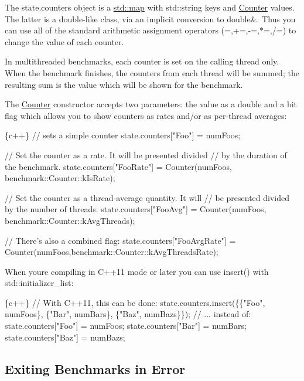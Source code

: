 The {\ttfamily state.\+counters} object is a {\ttfamily \mbox{\hyperlink{classstd_1_1map}{std\+::map}}} with {\ttfamily std\+::string} keys and {\ttfamily \mbox{\hyperlink{class_counter}{Counter}}} values. The latter is a {\ttfamily double}-\/like class, via an implicit conversion to {\ttfamily double\&}. Thus you can use all of the standard arithmetic assignment operators ({\ttfamily =,+=,-\/=,$\ast$=,/=}) to change the value of each counter.

In multithreaded benchmarks, each counter is set on the calling thread only. When the benchmark finishes, the counters from each thread will be summed; the resulting sum is the value which will be shown for the benchmark.

The {\ttfamily \mbox{\hyperlink{class_counter}{Counter}}} constructor accepts two parameters\+: the value as a {\ttfamily double} and a bit flag which allows you to show counters as rates and/or as per-\/thread averages\+:


\begin{DoxyCode}
\{c++\}
  // sets a simple counter
  state.counters["Foo"] = numFoos;

  // Set the counter as a rate. It will be presented divided
  // by the duration of the benchmark.
  state.counters["FooRate"] = Counter(numFoos, benchmark::Counter::kIsRate);

  // Set the counter as a thread-average quantity. It will
  // be presented divided by the number of threads.
  state.counters["FooAvg"] = Counter(numFoos, benchmark::Counter::kAvgThreads);

  // There's also a combined flag:
  state.counters["FooAvgRate"] = Counter(numFoos,benchmark::Counter::kAvgThreadsRate);
\end{DoxyCode}


When you\textquotesingle{}re compiling in C++11 mode or later you can use {\ttfamily insert()} with {\ttfamily std\+::initializer\+\_\+list}\+:


\begin{DoxyCode}
\{c++\}
  // With C++11, this can be done:
  state.counters.insert(\{\{"Foo", numFoos\}, \{"Bar", numBars\}, \{"Baz", numBazs\}\});
  // ... instead of:
  state.counters["Foo"] = numFoos;
  state.counters["Bar"] = numBars;
  state.counters["Baz"] = numBazs;
\end{DoxyCode}


\subsection*{Exiting Benchmarks in Error}

